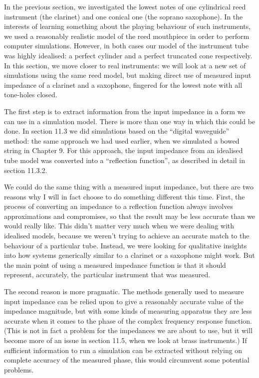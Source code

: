 

  In the previous section, we investigated the lowest notes of one cylindrical 
  reed instrument (the clarinet) and one conical one (the soprano saxophone). 
  In the interests of learning something about the playing behaviour of such 
  instruments, we used a reasonably realistic model of the reed mouthpiece in 
  order to perform computer simulations. However, in both cases our model of 
  the instrument tube was highly idealised: a perfect cylinder and a perfect 
  truncated cone respectively. In this section, we move closer to real 
  instruments: we will look at a new set of simulations using the same reed 
  model, but making direct use of measured input impedance of a clarinet and a 
  saxophone, fingered for the lowest note with all tone-holes closed. 


  The first step is to extract information from the input impedance in a form 
  we can use in a simulation model. There is more than one way in which this 
  could be done. In section 11.3 we did simulations based on the “digital 
  waveguide” method: the same approach we had used earlier, when we simulated a 
  bowed string in Chapter 9. For this approach, the input impedance from an 
  idealised tube model was converted into a “reflection function”, as described 
  in detail in section 11.3.2. 

  We could do the same thing with a measured input impedance, but there are two 
  reasons why I will in fact choose to do something different this time. First, 
  the process of converting an impedance to a reflection function always 
  involves approximations and compromises, so that the result may be less 
  accurate than we would really like. This didn’t matter very much when we were 
  dealing with idealised models, because we weren’t trying to achieve an 
  accurate match to the behaviour of a particular tube. Instead, we were 
  looking for qualitative insights into how systems generically similar to a 
  clarinet or a saxophone might work. But the main point of using a measured 
  impedance function is that it should represent, accurately, the particular 
  instrument that was measured. 

  The second reason is more pragmatic. The methods generally used to measure 
  input impedance can be relied upon to give a reasonably accurate value of the 
  impedance magnitude, but with some kinds of measuring apparatus they are less 
  accurate when it comes to the phase of the complex frequency response 
  function. (This is not in fact a problem for the impedances we are about to 
  use, but it will become more of an issue in section 11.5, when we look at 
  brass instruments.) If sufficient information to run a simulation can be 
  extracted without relying on complete accuracy of the measured phase, this 
  would circumvent some potential problems. 

